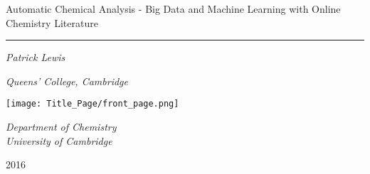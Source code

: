 \begin{titlepage}
	\centering
	{\huge Automatic Chemical Analysis - Big Data and Machine Learning with Online Chemistry Literature\par}
    \rule{0.8\textwidth}{1pt}\par
	{\Large\itshape Patrick Lewis\par}
	{\Large\itshape Queens' College, Cambridge \par}	
	\vspace{0.5cm}
	\texttt{[image: Title\_Page/front\_page.png]}\par\vspace{0.5cm}
	{\Large\itshape Department of Chemistry\\University of Cambridge\par}
	\vspace{0.5cm}
	{\large 2016\par}
\end{titlepage}
\restoregeometry